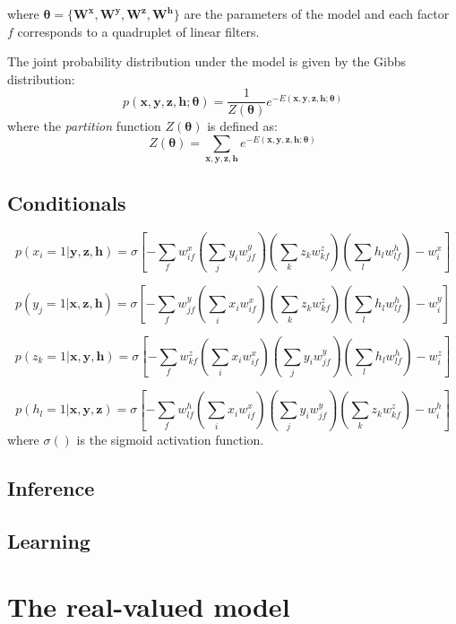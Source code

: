 \documentclass{article}
\begin{document}
where $\boldsymbol{\theta} = \{\boldsymbol{W^x}, \boldsymbol{W^y}, \boldsymbol{W^z}, \boldsymbol{W^h}\}$ are the parameters of the model and each factor $f$ corresponds to a quadruplet of linear filters.

The joint probability distribution under the model is given by the Gibbs distribution:
\begin{equation}
p(\boldsymbol{x},\boldsymbol{y},\boldsymbol{z},\boldsymbol{h};\boldsymbol{\theta}) = \frac{1}{Z(\boldsymbol{\theta})}e^{-E(\boldsymbol{x},\boldsymbol{y},\boldsymbol{z},\boldsymbol{h};\boldsymbol{\theta})}
\end{equation}
where the \textit{partition} function $Z(\boldsymbol{\theta})$ is defined as:
\begin{equation}
Z(\boldsymbol{\theta}) = \sum_{\boldsymbol{x},\boldsymbol{y},\boldsymbol{z},\boldsymbol{h}}{e^{-E(\boldsymbol{x},\boldsymbol{y},\boldsymbol{z},\boldsymbol{h};\boldsymbol{\theta})}}
\end{equation}


\subsection{Conditionals}

\begin{equation}
p(x_i=1|\boldsymbol{y},\boldsymbol{z},\boldsymbol{h}) = \sigma[-\sum_f{ w_{if}^x (\sum_j{y_i w_{jf}^y}) (\sum_k{z_k w_{kf}^z}) (\sum_l{h_l w_{lf}^h})} - w_i^x]
\end{equation}

\begin{equation}
p(y_j=1|\boldsymbol{x},\boldsymbol{z},\boldsymbol{h}) = \sigma[-\sum_f{ w_{jf}^y (\sum_i{x_i w_{if}^x}) (\sum_k{z_k w_{kf}^z}) (\sum_l{h_l w_{lf}^h})} - w_i^y]
\end{equation}

\begin{equation}
p(z_k=1|\boldsymbol{x},\boldsymbol{y},\boldsymbol{h}) = \sigma[-\sum_f{ w_{kf}^z (\sum_i{x_i w_{if}^x}) (\sum_j{y_i w_{jf}^y}) (\sum_l{h_l w_{lf}^h})} - w_i^z]
\end{equation}

\begin{equation}
p(h_l=1|\boldsymbol{x},\boldsymbol{y},\boldsymbol{z}) = \sigma[-\sum_f{ w_{lf}^h (\sum_i{x_i w_{if}^x}) (\sum_j{y_i w_{jf}^y}) (\sum_k{z_k w_{kf}^z})} - w_i^h]
\end{equation}
where $\sigma()$ is the sigmoid activation function.

\subsection{Inference}

\subsection{Learning}

\section{The real-valued model}
\end{document}
